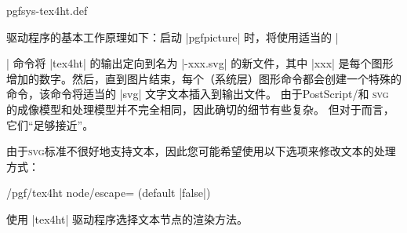 \begin{filedescription}{pgfsys-tex4ht.def}

    驱动程序的基本工作原理如下：启动 |{pgfpicture}| 时，将使用适当的 |\special| 命令将 |tex4ht| 的输出定向到名为 |\jobname-xxx.svg| 的新文件，其中 |xxx| 是每个图形增加的数字。然后，直到图片结束，每个（系统层）图形命令都会创建一个特殊的命令，该命令将适当的 |svg| 文字文本插入到输出文件。 由于PostScript/\pdf 和 \textsc{svg} 的成像模型和处理模型并不完全相同，因此确切的细节有些复杂。 但对于\pgfname 而言，它们``足够接近''。


    由于\textsc{svg}标准不很好地支持文本，因此您可能希望使用以下选项来修改文本的处理方式：

    \begin{key}{/pgf/tex4ht node/escape= (default |false|)} 

        使用 |tex4ht| 驱动程序选择文本节点的渲染方法。



\end{key}
\end{filedescription}
